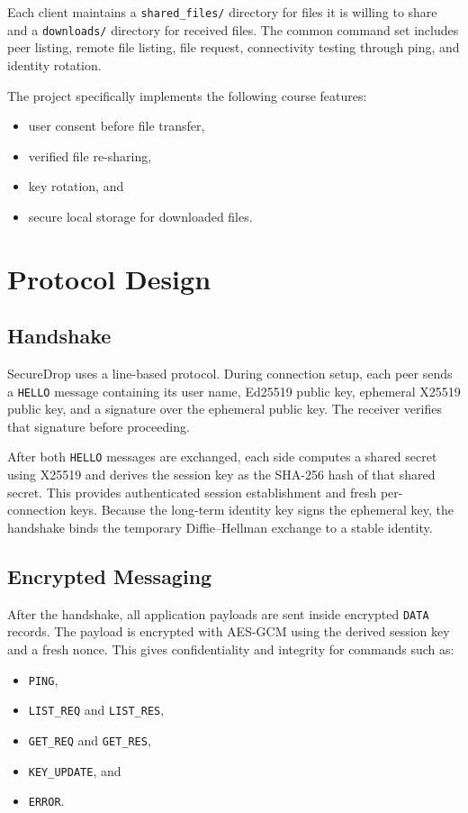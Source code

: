 \documentclass[sigconf,nonacm]{acmart}
\begin{document}
Each client maintains a \texttt{shared\_files/} directory for files it is
willing to share and a \texttt{downloads/} directory for received files.
The common command set includes peer listing, remote file listing, file
request, connectivity testing through ping, and identity rotation.

The project specifically implements the following course features:
\begin{itemize}
\item user consent before file transfer,
\item verified file re-sharing,
\item key rotation, and
\item secure local storage for downloaded files.
\end{itemize}

\section{Protocol Design}
\subsection{Handshake}
SecureDrop uses a line-based protocol. During connection setup, each peer
sends a \texttt{HELLO} message containing its user name, Ed25519 public
key, ephemeral X25519 public key, and a signature over the ephemeral
public key. The receiver verifies that signature before proceeding.

After both \texttt{HELLO} messages are exchanged, each side computes a
shared secret using X25519 and derives the session key as the SHA-256 hash
of that shared secret. This provides authenticated session establishment
and fresh per-connection keys. Because the long-term identity key signs
the ephemeral key, the handshake binds the temporary Diffie--Hellman
exchange to a stable identity.

\subsection{Encrypted Messaging}
After the handshake, all application payloads are sent inside encrypted
\texttt{DATA} records. The payload is encrypted with AES-GCM using the
derived session key and a fresh nonce. This gives confidentiality and
integrity for commands such as:
\begin{itemize}
\item \texttt{PING},
\item \texttt{LIST\_REQ} and \texttt{LIST\_RES},
\item \texttt{GET\_REQ} and \texttt{GET\_RES},
\item \texttt{KEY\_UPDATE}, and
\item \texttt{ERROR}.
\end{itemize}
\end{document}
